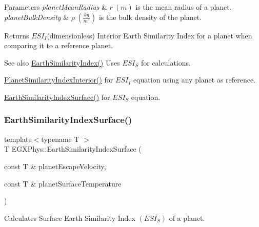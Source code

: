 \begin{DoxyParams}{Parameters}
{\em planet\+Mean\+Radius} & $r\ (m)$ is the mean radius of a planet. \\
\hline
{\em planet\+Bulk\+Density} & $\rho\ (\frac{kg}{m^3})$ is the bulk density of the planet. \\
\hline
\end{DoxyParams}
\begin{DoxyReturn}{Returns}
$ESI_I$(dimensionless) Interior Earth Similarity Index for a planet when comparing it to a reference planet. 
\end{DoxyReturn}
\begin{DoxySeeAlso}{See also}
\mbox{\hyperlink{group___e_g_x_phys-_planet_criteria_ga4b86397b1c839c49ac599d49fda207d4}{Earth\+Similarity\+Index()}} Uses $ESI_S$ for calculations. 

\mbox{\hyperlink{group___e_g_x_phys-_planet_criteria_ga6dc06a1a8baf6e132abed51fcf410c7f}{Planet\+Similarity\+Index\+Interior()}} for $ESI_I$ equation using any planet as reference. 

\mbox{\hyperlink{group___e_g_x_phys-_planet_criteria_ga1df772b0ed354ca7f7e4a7a4af072325}{Earth\+Similarity\+Index\+Surface()}} for $ESI_S$ equation. 
\end{DoxySeeAlso}
\mbox{\label{group___e_g_x_phys-_planet_criteria_ga1df772b0ed354ca7f7e4a7a4af072325}} 
\subsubsection{\texorpdfstring{Earth\+Similarity\+Index\+Surface()}{EarthSimilarityIndexSurface()}}
{\footnotesize\ttfamily template$<$typename T $>$ \\
T E\+G\+X\+Phys\+::\+Earth\+Similarity\+Index\+Surface (\begin{DoxyParamCaption}\item[{const T \&}]{planet\+Escape\+Velocity,  }\item[{const T \&}]{planet\+Surface\+Temperature }\end{DoxyParamCaption})}



Calculates Surface Earth Similarity Index $(ESI_S)$ of a planet. 

